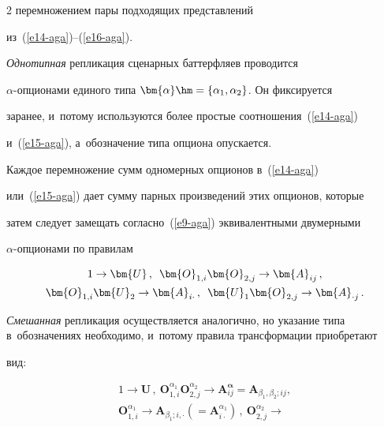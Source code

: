 \begin{multicols}{2}
перемножением пары подходящих представлений  


из~(\ref{e14-aga})--(\ref{e16-aga}). 


  


  \textit{Однотипная} репликация сценарных баттерфляев проводится 


  $\alpha$-оп\-ци\-она\-ми единого типа $\bm{\alpha}\hm=\{\alpha_1, \alpha_2\}$. Он фиксируется 


заранее, и~потому используются более простые соотношения~(\ref{e14-aga}) 


и~(\ref{e15-aga}), а~обозначение типа опциона опускается. 


  


  Каждое перемножение сумм одномерных опционов в~(\ref{e14-aga}) 


или~(\ref{e15-aga}) дает сумму парных произведений этих опционов, которые 


затем следует замещать согласно~(\ref{e9-aga}) эквивалентными двумерными 


$\alpha$-оп\-ци\-она\-ми по правилам 


  \begin{multline}


  1\to \bm{U}\,,\enskip \bm{O}_{1,i}\bm{O}_{2,j}\to \bm{A}_{ij}\,,\\ 


\bm{O}_{1,i}\bm{U}_2\to \bm{A}_{i\cdot}\,,\enskip \bm{U}_1 \bm{O}_{2,j}\to 


\bm{A}_{\cdot j}\,.


  \label{e17-aga}


  \end{multline}


  


  \textit{Смешанная} репликация осуществляется аналогично, но указание типа в~обозначениях необходимо, и~потому правила трансформации приобретают 


вид: 


  \begin{multline}


  1\to \bm{U}\,,\ \bm{O}_{1,i}^{\alpha_1} \bm{O}_{2,j}^{\alpha_2} \to 


\bm{A}_{ij}^{\bm {\alpha}}=\bm{A}_{\beta_1,\beta_2;ij},\\


\bm{O}_{1,i}^{\alpha_1}\to \bm{A}_{\beta_1;i,\cdot} \left( = 


\bm{A}^{\alpha_1}_{i\cdot}\right)\,,\ \bm{O}^{\alpha_2}_{2,j} \to 



\end{multline}
\end{multicols}
